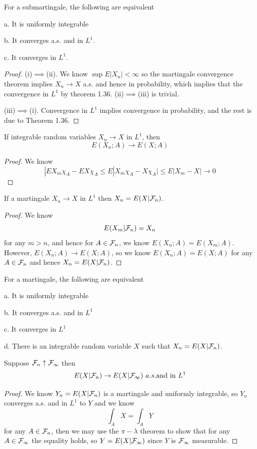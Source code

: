 \begin{theorem}
    For a submartingale, the following are equivalent\par
    a. It is uniformly integrable\par
    b. It converges a.s. and in $L^1$.\par
    c. It converges in $L^1$.
\end{theorem}
\begin{proof}
    (i)$\implies$(ii). We know $\sup E|X_n| < \infty$ so the martingale convergence theorem implies $X_n \to X$ a.s. and hence in probability, which implies that the convergence in $L^1$ by theorem 1.36. (ii)$\implies$(iii) is trivial.\par
    (iii)$\implies$(i). Convergence in $L^1$ implies convergence in probability, and the rest is due to Theorem 1.36.
\end{proof}

\begin{lemma}
    If integrable random variables $X_n\to X$ in $L^1$, then
    \[E(X_n;A) \to E(X;A)\]
\end{lemma}
\begin{proof}
    We know
    \[|EX_m\chi_A - EX\chi_A \leq E|X_m\chi_A - X\chi_A| \leq E|X_m - X| \to 0\]
\end{proof}

\begin{lemma}
    If a martingale $X_n\to X$ in $L^1$ then $X_n = E(X|\mathcal{F}_n)$.
\end{lemma}
\begin{proof}
    We know
    \[E(X_m|\mathcal{F}_n) = X_n\]
    for any $m>n$, and hence for $A\in\mathcal{F}_n$, we know $E(X_n;A) = E(X_m;A)$. However, $E(X_n;A) \to E(X;A)$, so we know $E(X_n;A) = E(X;A)$ for any $A\in\mathcal{F}_n$ and hence $X_n = E(X|\mathcal{F}_n)$.
\end{proof}

\begin{theorem}
    For a martingale, the following are equivalent\par
    a. It is uniformly integrable\par
    b. It converges a.s. and in $L^1$\par
    c. It converges in $L^1$\par
    d. There is an integrable random variable $X$ such that $X_n = E(X|\mathcal{F}_n)$.
\end{theorem}

\begin{theorem}
    Suppose $\mathcal{F}_n \uparrow \mathcal{F}_{\infty}$ then
    \[E(X|\F_n) \to E(X|\F_{\infty})\ a.s.\text{and in }L^1\]
\end{theorem}
\begin{proof}
    We know $Y_n = E(X|\mathcal{F}_n)$ is a martingale and uniformly integrable, so $Y_n$ converges a.s. and in $L^1$ to $Y$ and we know
    \[
    \int_A X = \int_A Y
    \]
    for any $A\in\mathcal{F}_n$, then we may use the $\pi-\lambda$ theorem to show that for any $A\in\mathcal{F}_{\infty}$ the equality holds, so $Y = E(X|\mathcal{F}_{\infty})$ since $Y$ is $\mathcal{F}_{\infty}$ measurable.
\end{proof}


